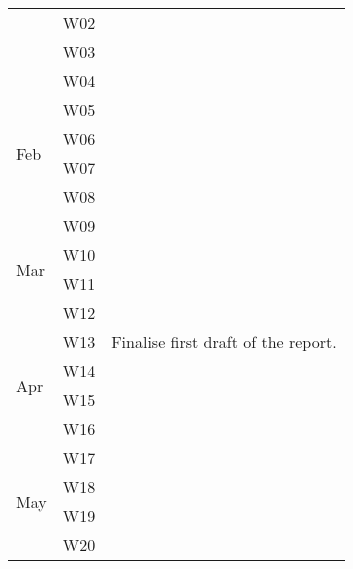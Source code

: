 \documentclass{article}
\begin{document}
\begin{table}[]
\begin{tabular}{lll}
                     & W02  & \\
                     & W03  & \\
                     & W04  & \\ \hline
\multirow{4}{*}{Feb} & W05  & \\
                     & W06  & \\
                     & W07  & \\
                     & W08  & \\ \hline
\multirow{4}{*}{Mar} & W09  & \\
                     & W10  & \\
                     & W11  & \\
                     & W12  & \\ \hline
\multirow{4}{*}{Apr} & W13  & Finalise first draft of the report. \\
                     & W14  & \\
                     & W15  & \\
                     & W16  & \\ \hline
\multirow{4}{*}{May} & W17  & \\
                     & W18  & \\
                     & W19  & \\
                     & W20  & \\
\end{tabular}
\end{table}

\newpage


\end{document}
